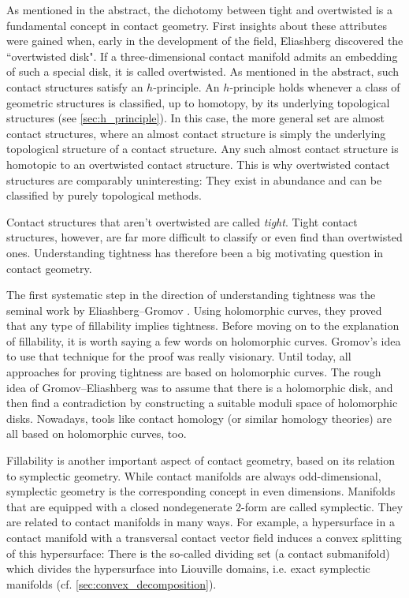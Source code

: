 As mentioned in the abstract, the dichotomy between tight and overtwisted is a fundamental concept in contact geometry.
First insights about these attributes were gained when, early in the development of the field, 
Eliashberg discovered the ``overtwisted disk".
If a three-dimensional contact manifold admits an embedding of such a special disk, it is called overtwisted.
As mentioned in the abstract, such contact structures satisfy an $h$-principle.
An $h$-principle holds whenever a class of geometric structures is classified, 
up to homotopy, by its underlying topological structures (see \cref{sec:h_principle}).
In this case, the more general set are almost contact structures, where an almost contact structure
is simply the underlying topological structure of a contact structure.
Any such almost contact structure is homotopic to an overtwisted contact structure.
This is why overtwisted contact structures are comparably uninteresting: They exist
in abundance and can be classified by purely topological methods.

Contact structures that aren't overtwisted are called \textit{tight}.
Tight contact structures, however, are far more difficult to classify or even find than overtwisted ones.
Understanding tightness has therefore been a big motivating question in contact geometry.

The first systematic step in the direction of understanding tightness was the seminal work
by Eliashberg--Gromov \cite{Gromov85, Eliashberg91}. Using holomorphic curves, they proved that any type of fillability implies tightness.
Before moving on to the explanation of fillability, it is worth saying a few words on holomorphic curves.
Gromov's idea to use that technique for the proof was really visionary. 
Until today, all approaches for proving tightness are based on holomorphic curves.
The rough idea of Gromov--Eliashberg was to assume that there is a holomorphic disk, 
and then find a contradiction by constructing a suitable moduli space of holomorphic disks.
Nowadays, tools like contact homology (or similar homology theories) are all based on holomorphic curves, too.

Fillability is another important aspect of contact geometry, based on its relation to symplectic geometry.
While contact manifolds are always odd-dimensional, symplectic geometry is the corresponding concept in even dimensions.
Manifolds that are equipped with a closed nondegenerate 2-form are called symplectic. They are related
to contact manifolds in many ways.
For example, a hypersurface in a contact manifold with a transversal contact vector field
induces a convex splitting of this hypersurface: There is the so-called dividing set (a contact submanifold)
which divides the hypersurface into Liouville domains, i.e. exact symplectic manifolds (cf. \cref{sec:convex_decomposition}).

